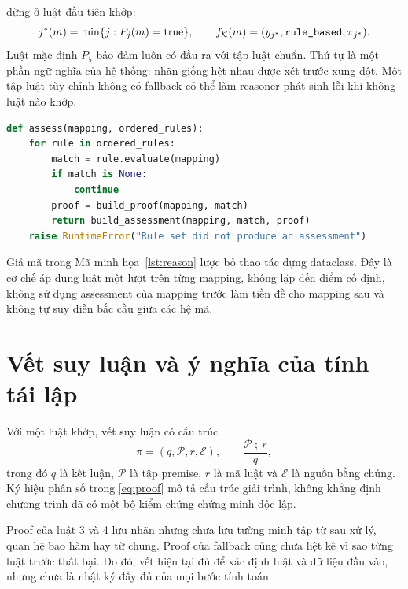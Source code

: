  dừng ở luật đầu tiên khớp:
\begin{equation}
 j^*(m)=\min\{j:P_j(m)=\mathrm{true}\},\qquad
 f_{\mathcal{K}}(m)=(y_{j^*},\texttt{rule\_based},\pi_{j^*}).
 \label{eq:firstmatch}
\end{equation}
Luật mặc định $P_5$ bảo đảm luôn có đầu ra với tập luật chuẩn.
Thứ tự là một phần ngữ nghĩa của hệ thống: nhãn giống hệt nhau được
xét trước xung đột. Một tập luật tùy chỉnh không có fallback có thể làm
reasoner phát sinh lỗi khi không luật nào khớp.

\noindent\begin{minipage}{\linewidth}
\begin{lstlisting}[language=Python,caption={Giả mã tương ứng với vòng lặp của COKBReasoner.assess},label={lst:reason}]
def assess(mapping, ordered_rules):
    for rule in ordered_rules:
        match = rule.evaluate(mapping)
        if match is None:
            continue
        proof = build_proof(mapping, match)
        return build_assessment(mapping, match, proof)
    raise RuntimeError("Rule set did not produce an assessment")
\end{lstlisting}
\end{minipage}

Giả mã trong Mã minh họa~\ref{lst:reason} lược bỏ thao tác dựng dataclass.
Đây là cơ chế áp dụng luật một lượt trên từng mapping, không lặp đến điểm
cố định, không sử dụng assessment của mapping trước làm tiền đề cho mapping
sau và không tự suy diễn bắc cầu giữa các hệ mã.

\section{Vết suy luận và ý nghĩa của tính tái lập}
Với một luật khớp, vết suy luận có cấu trúc
\begin{equation}
  \pi=(q,\mathcal{P},r,\mathcal{E}),
  \qquad
  \frac{\mathcal{P}\ ;\ r}{q},
  \label{eq:proof}
\end{equation}
trong đó $q$ là kết luận, $\mathcal{P}$ là tập premise, $r$ là mã luật và
$\mathcal{E}$ là nguồn bằng chứng. Ký hiệu phân số trong
\eqref{eq:proof} mô tả cấu trúc giải trình, không khẳng định chương trình
đã có một bộ kiểm chứng chứng minh độc lập.

Proof của luật 3 và 4 lưu nhãn nhưng chưa lưu tường minh tập từ sau xử lý,
quan hệ bao hàm hay từ chung. Proof của fallback cũng chưa liệt kê vì sao
từng luật trước thất bại. Do đó, vết hiện tại đủ để xác định luật và dữ
liệu đầu vào, nhưng chưa là nhật ký đầy đủ của mọi bước tính toán.

